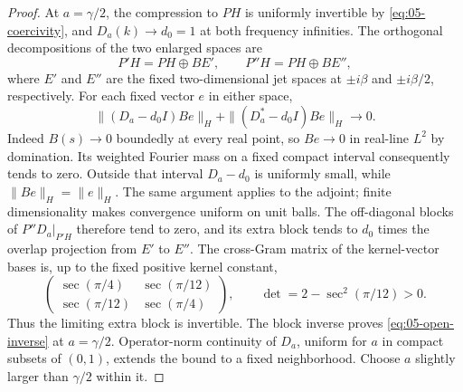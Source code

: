 \begin{proof}
At \(a=\gamma/2\), the compression to \(PH\) is uniformly invertible by \eqref{eq:05-coercivity}, and \(D_a(k)\to d_0=1\) at both frequency infinities. The orthogonal decompositions of the two enlarged spaces are
\[
 P'H=PH\oplus B E',\qquad P''H=PH\oplus B E'',
\]
where \(E'\) and \(E''\) are the fixed two-dimensional jet spaces at \(\pm i\beta\) and \(\pm i\beta/2\), respectively. For each fixed vector \(e\) in either space,
\[
 \|(D_a-d_0I)Be\|_H+
 \|(D_a^*-d_0I)Be\|_H\longrightarrow0.
\]
Indeed \(B(s)\to0\) boundedly at every real point, so \(Be\to0\) in real-line \(L^2\) by domination. Its weighted Fourier mass on a fixed compact interval consequently tends to zero. Outside that interval \(D_a-d_0\) is uniformly small, while \(\|Be\|_H=\|e\|_H\). The same argument applies to the adjoint; finite dimensionality makes convergence uniform on unit balls. The off-diagonal blocks of \(P''D_a|_{P'H}\) therefore tend to zero, and its extra block tends to \(d_0\) times the overlap projection from \(E'\) to \(E''\). The cross-Gram matrix of the kernel-vector bases is, up to the fixed positive kernel constant,
\[
 \begin{pmatrix}
 \sec(\pi/4)&\sec(\pi/12)\\
 \sec(\pi/12)&\sec(\pi/4)
 \end{pmatrix},
 \qquad \det=2-\sec^2(\pi/12)>0.
\]
Thus the limiting extra block is invertible. The block inverse proves \eqref{eq:05-open-inverse} at \(a=\gamma/2\). Operator-norm continuity of \(D_a\), uniform for \(a\) in compact subsets of \((0,1)\), extends the bound to a fixed neighborhood. Choose \(a\) slightly larger than \(\gamma/2\) within it.


\end{proof}

